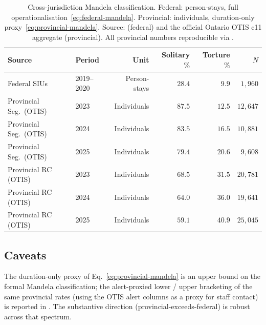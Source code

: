 \documentclass[article,shortnames,nojss]{jss}
\newcommand{\OTIS}{\textsf{OTIS}}
\begin{document}
\begin{table}[h]
\centering
\caption{Cross-jurisdiction Mandela classification. Federal:
person-stays, full operationalisation~\eqref{eq:federal-mandela}.
Provincial: individuals, duration-only proxy~\eqref{eq:provincial-mandela}.
Source: \citealt{SprottDoob2023} (federal) and the official Ontario
\OTIS{} c11 aggregate (provincial). All provincial numbers
reproducible via
.}
\label{tab:res-mandela}
\small
\begin{tabular}{llrrrr}
\toprule
Source & Period & Unit & Solitary $\%$ & Torture $\%$ & $N$ \\
\midrule
Federal SIUs               & 2019--2020 & Person-stays   & $28.4$ & $9.9$  & $1{,}960$ \\
\midrule
Provincial Seg.\ (\OTIS{}) & 2023       & Individuals    & $87.5$ & $12.5$ & $12{,}647$ \\
Provincial Seg.\ (\OTIS{}) & 2024       & Individuals    & $83.5$ & $16.5$ & $10{,}881$ \\
Provincial Seg.\ (\OTIS{}) & 2025       & Individuals    & $79.4$ & $20.6$ & $9{,}608$ \\
\midrule
Provincial RC (\OTIS{})    & 2023       & Individuals    & $68.5$ & $31.5$ & $20{,}781$ \\
Provincial RC (\OTIS{})    & 2024       & Individuals    & $64.0$ & $36.0$ & $19{,}641$ \\
Provincial RC (\OTIS{})    & 2025       & Individuals    & $59.1$ & $40.9$ & $25{,}045$ \\
\bottomrule
\end{tabular}
\end{table}

\subsection{Caveats}
\label{sec:mandela-caveats}

The duration-only proxy of Eq.~\eqref{eq:provincial-mandela} is an
upper bound on the formal Mandela classification; the
alert-proxied lower / upper bracketing of the same provincial
rates (using the OTIS alert columns as a proxy for staff
contact) is reported in \citet{Ruhela2026MRM}.
The substantive direction (provincial-exceeds-federal) is robust
across that spectrum.
\end{document}
